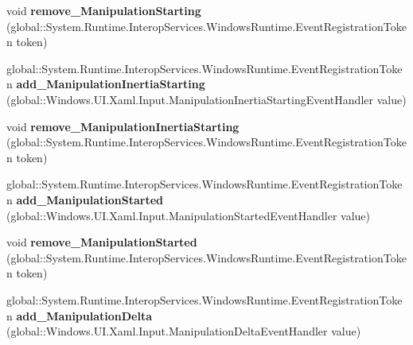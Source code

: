 \begin{DoxyCompactItemize}
\item 
\mbox{\label{interface_windows_1_1_u_i_1_1_xaml_1_1_i_u_i_element_aacad93dba45c725c051fd835e8599cc8}} 
void {\bfseries remove\+\_\+\+Manipulation\+Starting} (global\+::\+System.\+Runtime.\+Interop\+Services.\+Windows\+Runtime.\+Event\+Registration\+Token token)
\item 
\mbox{\label{interface_windows_1_1_u_i_1_1_xaml_1_1_i_u_i_element_a8b3a684ee7f64d2a3b27633301a58825}} 
global\+::\+System.\+Runtime.\+Interop\+Services.\+Windows\+Runtime.\+Event\+Registration\+Token {\bfseries add\+\_\+\+Manipulation\+Inertia\+Starting} (global\+::\+Windows.\+U\+I.\+Xaml.\+Input.\+Manipulation\+Inertia\+Starting\+Event\+Handler value)
\item 
\mbox{\label{interface_windows_1_1_u_i_1_1_xaml_1_1_i_u_i_element_a45e976afe0af013e41228cbdbdf558d2}} 
void {\bfseries remove\+\_\+\+Manipulation\+Inertia\+Starting} (global\+::\+System.\+Runtime.\+Interop\+Services.\+Windows\+Runtime.\+Event\+Registration\+Token token)
\item 
\mbox{\label{interface_windows_1_1_u_i_1_1_xaml_1_1_i_u_i_element_a0a6629935ddc66f152be79ea1665fe62}} 
global\+::\+System.\+Runtime.\+Interop\+Services.\+Windows\+Runtime.\+Event\+Registration\+Token {\bfseries add\+\_\+\+Manipulation\+Started} (global\+::\+Windows.\+U\+I.\+Xaml.\+Input.\+Manipulation\+Started\+Event\+Handler value)
\item 
\mbox{\label{interface_windows_1_1_u_i_1_1_xaml_1_1_i_u_i_element_a474a76e685a8b1af9722e5560b7d4c12}} 
void {\bfseries remove\+\_\+\+Manipulation\+Started} (global\+::\+System.\+Runtime.\+Interop\+Services.\+Windows\+Runtime.\+Event\+Registration\+Token token)
\item 
\mbox{\label{interface_windows_1_1_u_i_1_1_xaml_1_1_i_u_i_element_a478e7f65d80dfe362a865349005a2475}} 
global\+::\+System.\+Runtime.\+Interop\+Services.\+Windows\+Runtime.\+Event\+Registration\+Token {\bfseries add\+\_\+\+Manipulation\+Delta} (global\+::\+Windows.\+U\+I.\+Xaml.\+Input.\+Manipulation\+Delta\+Event\+Handler value)

\end{DoxyCompactItemize}
